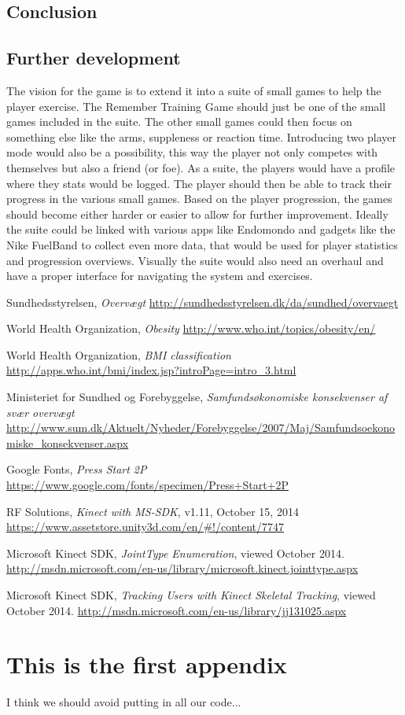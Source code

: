 \documentclass[11pt]{report}
\begin{document}
\section{Conclusion}


\section{Further development}
The vision for the game is to extend it into a suite of small games to help the player exercise. The Remember Training Game should just be one of the small games included in the suite. The other small games could then focus on something else like the arms, suppleness or reaction time. Introducing two player mode would also be a possibility, this way the player not only competes with themselves but also a friend (or foe). As a suite, the players would have a profile where they stats would be logged. The player should then be able to track their progress in the various small games. Based on the player progression, the games should become either harder or easier to allow for further improvement. Ideally the suite could be linked with various apps like Endomondo and gadgets like the Nike FuelBand to collect even more data, that would be used for player statistics and progression overviews. Visually the suite would also need an overhaul and have a proper interface for navigating the system and exercises.


\begin{thebibliography}{9}
  Sundhedsstyrelsen,
  \emph{Overv\ae gt}
  \url{http://sundhedsstyrelsen.dk/da/sundhed/overvaegt}

	World Health Organization,
	\emph{Obesity}
	\url{http://www.who.int/topics/obesity/en/}
	
	World Health Organization,
	\emph{BMI classification}
	\url{http://apps.who.int/bmi/index.jsp?introPage=intro_3.html}

	Ministeriet for Sundhed og Forebyggelse,
	\emph{Samfunds\o konomiske konsekvenser af sv\ae r overv\ae gt}
	\url{http://www.sum.dk/Aktuelt/Nyheder/Forebyggelse/2007/Maj/Samfundsoekonomiske_konsekvenser.aspx}

	Google Fonts, \emph{Press Start 2P}
	\url{https://www.google.com/fonts/specimen/Press+Start+2P}
	
	RF Solutions, \emph{Kinect with MS-SDK}, v1.11, October 15, 2014
	\url{https://www.assetstore.unity3d.com/en/#!/content/7747}

	Microsoft Kinect SDK, \emph{JointType Enumeration}, viewed October 2014.
	\url{http://msdn.microsoft.com/en-us/library/microsoft.kinect.jointtype.aspx}
	
	Microsoft Kinect SDK, \emph{Tracking Users with Kinect Skeletal Tracking}, viewed October 2014.
	\url{http://msdn.microsoft.com/en-us/library/jj131025.aspx}

\end{thebibliography}


\appendix

\chapter{This is the first appendix}
I think we should avoid putting in all our code...
\end{document}
